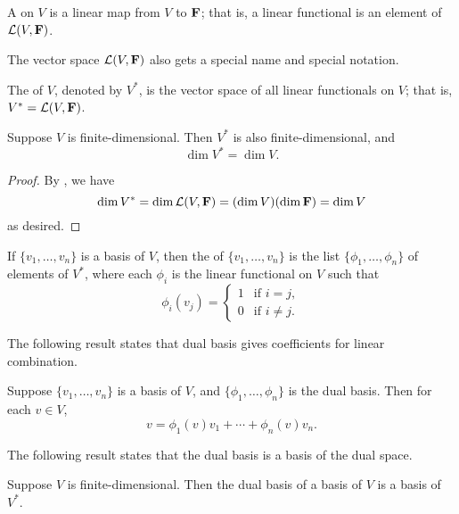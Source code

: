 \begin{definition}
A  on $V$ is a linear map from $V$ to $\mathbf F$; that is, a linear functional is an element of $\mathcal{L}(V,\mathbf F)$.
\end{definition}

The vector space $\mathcal{L}(V,\mathbf F)$ also gets a special name and special notation.

\begin{definition}
The  of $V$, denoted by $V^*$, is the vector space of all linear functionals on $V$; that is, $V^*=\mathcal{L}(V,\mathbf F)$.
\end{definition}

\begin{lemma}
Suppose $V$ is finite-dimensional. Then $V^*$ is also finite-dimensional, and
\[\dim V^*=\dim V.\]
\end{lemma}

\begin{proof}
By , we have
\[\dim V^*=\dim\mathcal{L}(V,\mathbf F)=(\dim V)(\dim\mathbf F)=\dim V\]
as desired.
\end{proof}

\begin{definition}
If $\{v_1,\dots,v_n\}$ is a basis of $V$, then the  of $\{v_1,\dots,v_n\}$ is the list $\{\phi_1,\dots,\phi_n\}$ of elements of $V^*$, where each $\phi_i$ is the linear functional on $V$ such that
\[\phi_i(v_j)=\begin{cases}
1&\text{if }i=j,\\
0&\text{if }i\neq j.
\end{cases}\]
\end{definition}

The following result states that dual basis gives coefficients for linear combination.

\begin{proposition}
Suppose $\{v_1,\dots,v_n\}$ is a basis of $V$, and $\{\phi_1,\dots,\phi_n\}$ is the dual basis. Then for each $v\in V$,
\[v=\phi_1(v)v_1+\cdots+\phi_n(v)v_n.\]
\end{proposition}

The following result states that the dual basis is a basis of the dual space.

\begin{proposition}
Suppose $V$ is finite-dimensional. Then the dual basis of a basis of $V$ is a basis of $V^*$.
\end{proposition}

